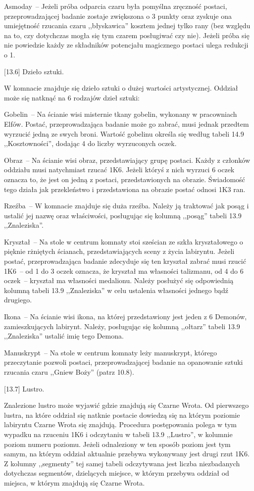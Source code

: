Asmoday~-- Jeżeli próba odparcia czaru była pomyślna zręczność postaci, przeprowadzającej badanie zostaje zwiększona o 3 punkty oraz zyskuje ona umiejętność rzucania czaru ,,błyskawica'' kosztem jednej tylko rany (bez względu na to, czy dotychczas mogła się tym czarem posługiwać czy nie).
Jeżeli próba się nie powiedzie każdy ze składników potencjału magicznego postaci ulega redukcji o 1.

[13.6] Dzieło sztuki.

W komnacie znajduje się dzieło sztuki o dużej wartości artystycznej.
Oddział może się natknąć na 6 rodzajów dzieł sztuki:

Gobelin~-- Na ścianie wisi misternie tkany gobelin, wykonany w pracowniach Elfów.
Postać, przeprowadzająca badanie może go zabrać, musi jednak przedtem wyrzucić jedną ze swych broni.
Wartość gobelinu określa się według tabeli 14.9 ,,Kosztowności'', dodając 4 do liczby wyrzuconych oczek.

Obraz~-- Na ścianie wisi obraz, przedstawiający grupę postaci.
Każdy z członków oddziału musi natychmiast rzucać 1K6.
Jeżeli któryś z nich wyrzuci 6 oczek oznacza to, że jest on jedną z postaci, przedstawionych na obrazie.
Świadomość tego działa jak przekleństwo i przedstawiona na obrazie postać odnosi 1K3 ran.

Rzeźba~-- W komnacie znajduje się duża rzeźba.
Należy ją traktować jak posąg i ustalić jej nazwę oraz właściwości, posługując się kolumną ,,posąg'' tabeli 13.9 ,,Znaleziska''.

Kryształ~-- Na stole w centrum komnaty stoi sześcian ze szkła kryształowego o pięknie rżniętych ścianach, przedstawiających sceny z życia labiryntu.
Jeżeli postać, przeprowadzająca badanie zdecyduje się ten kryształ zabrać musi rzucić 1K6~-- od 1 do 3 oczek oznacza, że kryształ ma własności talizmanu, od 4 do 6 oczek~-- kryształ ma własności medalionu.
Należy posłużyć się odpowiednią kolumną tabeli 13.9 ,,Znaleziska'' w celu ustalenia własności jednego bądź drugiego.

Ikona~-- Na ścianie wisi ikona, na której przedstawiony jest jeden z 6 Demonów, zamieszkujących labirynt.
Należy, posługując się kolumną ,,ołtarz'' tabeli 13.9 ,,Znaleziska'' ustalić imię tego Demona.

Manuskrypt~-- Na stole w centrum komnaty leży manuskrypt, którego przeczytanie pozwoli postaci, przeprowadzającej badanie na opanowanie sztuki rzucania czaru ,,Gniew Boży'' (patrz 10.8).

[13.7] Lustro.

Znalezione lustro może wyjawić gdzie znajdują się Czarne Wrota.
Od pierwszego lustra, na które oddział się natknie postacie dowiedzą się na którym poziomie labiryntu Czarne Wrota się znajdują.
Procedura postępowania polega w tym wypadku na rzuceniu 1K6 i odczytaniu w tabeli 13.9 ,,Lustro'', w kolumnie poziom numeru poziomu.
Jeżeli odnaleziony w ten sposób poziom jest tym samym, na którym oddział aktualnie przebywa wykonywany jest drugi rzut 1K6.
Z kolumny ,,segmenty'' tej samej tabeli odczytywana jest liczba niezbadanych dotychczas segmentów, dzielących miejsce, w którym przebywa oddział od miejsca, w którym znajdują się Czarne Wrota.

